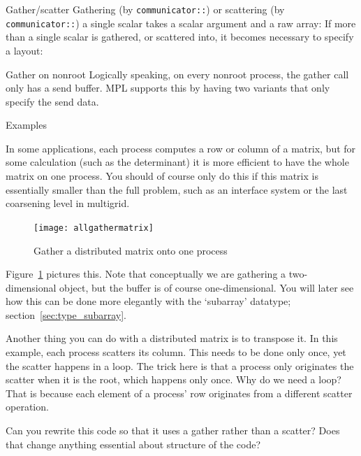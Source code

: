 \begin{mplnote}{Gather/scatter}
  Gathering (by \lstinline+communicator::+)
  or scattering (by \lstinline+communicator::+)
  a single scalar takes a scalar argument
  and a raw array:
  If more than a single scalar is gathered, or scattered into,
  it becomes necessary to specify a layout:
\end{mplnote}

\begin{mplnote}{Gather on nonroot}
  Logically speaking, on every nonroot process,
  the gather call only has a send buffer.
  MPL supports this by having two variants that only specify the send data.
\end{mplnote}

 {Examples}

In some applications, each process computes a row or column of a
matrix, but for some calculation (such as the determinant) it is more
efficient to have the whole matrix on one process. You should of
course only do this if this matrix is essentially smaller than the
full problem, such as an interface system or the last coarsening level
in multigrid.

\begin{figure}[ht]
  \texttt{[image: allgathermatrix]}
  \caption{Gather a distributed matrix onto one process}
  \label{fig:allgathermatrix}
\end{figure}

Figure~\ref{fig:allgathermatrix} pictures this. Note that conceptually
we are gathering a two-dimensional object, but the buffer is of course
one-dimensional. You will later see how this can be done more
elegantly with the `subarray' datatype; section~\ref{sec:type_subarray}.

Another thing you can do with a distributed matrix is to transpose it.
%
%
In this example, each process scatters its column.
This needs to be done only once, yet the scatter happens in a loop.
The trick here is that a process only originates the scatter when it
is the root, which happens only once.
Why do we need a loop? That is because each element of a process' row
originates from a different scatter operation.

\begin{exercise}
  Can you rewrite this code so that it uses a gather rather than a scatter?
  Does that change anything essential about structure of the code?
\end{exercise}

